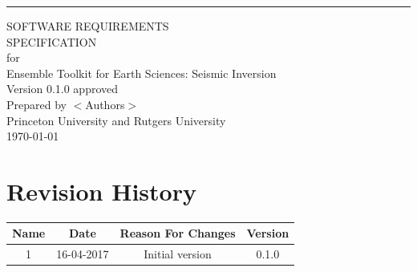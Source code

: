 \documentclass{scrreprt}
\date{}
\title{}
\def\myversion{0.1.0 }
\def\projname{Ensemble Toolkit for Earth Sciences: Seismic Inversion}
\def\projauthors{$<$Authors$>$}
\begin{document}
\begin{flushright}
    \rule{16cm}{5pt}\vskip1cm
    \begin{bfseries}
        \Huge{SOFTWARE REQUIREMENTS\\ SPECIFICATION}\\
        \vspace{1.9cm}
        for\\
        \vspace{1.9cm}
        \projname \\
        \vspace{1.9cm}
        \LARGE{Version \myversion approved}\\
        \vspace{1.9cm}
        Prepared by \projauthors\\
        \vspace{1.9cm}
        Princeton University and Rutgers University\\
        \vspace{1.9cm}
        \today\\
    \end{bfseries}
\end{flushright}

\tableofcontents


\chapter*{Revision History}

\begin{center}
    \begin{tabular}{|c|c|c|c|}
        \hline
	    Name & Date & Reason For Changes & Version\\
        \hline
	    1 & 16-04-2017 & Initial version & 0.1.0\\
        \hline
    \end{tabular}
\end{center}


\end{document}
